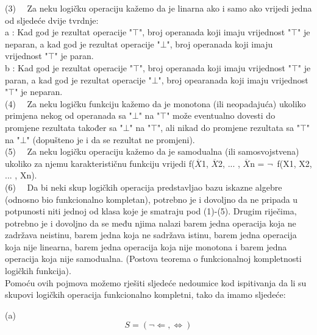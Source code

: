 \documentclass[12pt]{article}
\begin{document}
\begin{enumerate}
		  (3)~~ Za neku logičku operaciju kažemo da je linarna ako i samo ako vrijedi jedna od sljedeće dvije tvrdnje: \\
		  
		  a : Kad god je rezultat operacije "{$\top$}", broj operanada koji imaju vrijednost "{$\top$}" je neparan, a kad god je rezultat operacije "{$\bot$}", broj operanada koji imaju vrijednost "{$\top$}" je paran. \\
		  
		  b : Kad god je rezultat operacije "{$\top$}", broj operanada koji imaju vrijednost "{$\top$}" je paran, a kad god je rezultat operacije "{$\bot$}", broj opearanada koji imaju vrijednost "{$\top$}" je neparan. \\
		  
		  (4)~~ Za neku logičku funkciju kažemo da je monotona (ili neopadajuća) ukoliko primjena nekog od operanada sa "{$\bot$}" na "{$\top$}" može eventualno dovesti do promjene rezultata također sa "{$\bot$}" na "{$\top$}", ali nikad do promjene rezultata sa "{$\top$}" na "{$\bot$}" (dopušteno je i da se rezultat ne promjeni). \\
		  
		  (5)~~ Za neku logičku operaciju kažemo da je samodualna (ili samosvojstvena) ukoliko za njemu karakterističnu funkciju vrijedi f({$\overline{X}$}1, {$\overline{X}$}2, ... , {$\overline{X}$}n = {$\neg$}~f(X1,  X2, ... , Xn). \\
		  
		  (6)~~ Da bi neki skup logičkih operacija predstavljao bazu iskazne algebre (odnosno bio funkcionalno kompletan), potrebno je i dovoljno da ne pripada u potpunosti niti jednoj od klasa koje je smatraju pod (1)-(5). Drugim riječima, potrebno je i dovoljno da se među njima nalazi barem jedna operacija koja ne zadržava neistinu, barem jedna koja ne sadržava istinu, barem jedna operacija koja nije linearna, barem jedna operacija koja nije monotona i barem jedna operacija koja nije samodualna. (Postova teorema o funkcionalnoj kompletnosti logičkih funkcija). \\
		  
		  
		  Pomoću ovih pojmova možemo rješiti sljedeće nedoumice kod ispitivanja da li su skupovi logičkih operacija funkcionalno kompletni, tako da imamo sljedeće: \\
		  
		  \newpage
		  
		  (a) \begin{equation*}
		       S = (\neg\Leftarrow, \Leftrightarrow) 
		  \end{equation*}
		  

\end{enumerate}
\end{document}

